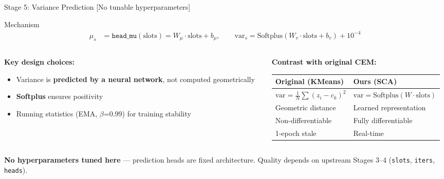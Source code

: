 \documentclass[aspectratio=169, 10pt]{beamer}
\newcommand{\param}[1]{\textcolor{paramred}{\texttt{#1}}}
\begin{document}
\begin{frame}{Stage 5: Variance Prediction \quad\small[No tunable hyperparameters]}

\begin{block}{Mechanism}
\vspace{-0.3cm}
\begin{align*}
\mu_s &= \texttt{head\_mu}(\text{slots}) = W_\mu \cdot \text{slots} + b_\mu, \qquad
\text{var}_s = \text{Softplus}(W_v \cdot \text{slots} + b_v) + 10^{-4}
\end{align*}
\vspace{-0.4cm}
\end{block}

\begin{columns}[T]
\begin{column}{0.48\textwidth}
\textbf{Key design choices:}
\begin{itemize}
    \item Variance is \textbf{predicted by a neural network}, not computed geometrically
    \item \textbf{Softplus} ensures positivity
    \item Running statistics (EMA, $\beta$=0.99) for training stability
\end{itemize}
\end{column}
\begin{column}{0.48\textwidth}
\textbf{Contrast with original CEM:}
\begin{center}
\scriptsize
\begin{tabular}{p{2.8cm}p{2.8cm}}
\toprule
\textbf{Original (KMeans)} & \textbf{Ours (SCA)} \\
\midrule
$\text{var} = \frac{1}{N}\sum(z_i - c_k)^2$ & $\text{var} = \text{Softplus}(W \cdot \text{slots})$ \\
Geometric distance & Learned representation \\
Non-differentiable & Fully differentiable \\
1-epoch stale & Real-time \\
\bottomrule
\end{tabular}
\end{center}
\end{column}
\end{columns}

\vspace{0.1cm}
\small
\textbf{No hyperparameters tuned here} --- prediction heads are fixed architecture. Quality depends on upstream Stages 3--4 (\param{slots}, \param{iters}, \param{heads}).

\end{frame}
\end{document}
